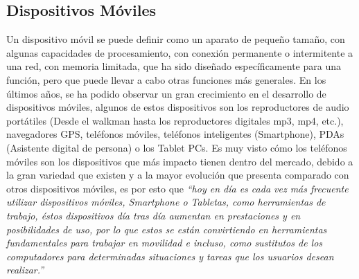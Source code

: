\documentclass[12pt,letterpaper,openany]{book}
\begin{document}
\subsection{Dispositivos Móviles}
Un dispositivo móvil se puede definir como un aparato de pequeño tamaño, con algunas capacidades de procesamiento, con conexión permanente o intermitente a una red, con memoria limitada, que ha sido diseñado específicamente para una función, pero que puede llevar a cabo otras funciones más generales\cite{10}.
\vspace{5mm}\newline
En los últimos años, se ha podido observar un gran crecimiento en el desarrollo de dispositivos móviles, algunos de estos dispositivos son los reproductores de audio portátiles (Desde el walkman hasta los reproductores digitales mp3, mp4, etc.), navegadores GPS, teléfonos móviles, teléfonos inteligentes (Smartphone), PDAs (Asistente digital de persona) o los Tablet PCs.
\vspace{5mm}\newline
Es muy visto cómo los teléfonos móviles son los dispositivos que más impacto tienen dentro del mercado, debido a la gran variedad que existen y a la mayor evolución que presenta comparado con otros dispositivos móviles, es por esto que \textit{“hoy en día es cada vez más frecuente utilizar dispositivos móviles, Smartphone o Tabletas, como herramientas de trabajo, éstos dispositivos día tras día aumentan en prestaciones y en posibilidades de uso, por lo que estos se están convirtiendo en herramientas fundamentales para trabajar en movilidad e incluso, como sustitutos de los computadores para determinadas situaciones y tareas que los usuarios desean realizar.”} \cite{11} 
\end{document}
